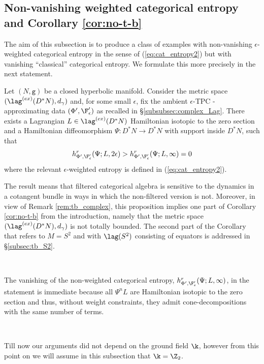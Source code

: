 \subsection{Non-vanishing weighted categorical entropy and Corollary \ref{cor:no-t-b}}
\label{subsec:non-v_Cor} The aim of this subsection is to produce a class of examples with non-vanishing $\epsilon$-weighted categorical entropy in the sense of (\ref{eq:cat_entropy2}) but with vanishing  ``classical'' categorical entropy. We formulate this more precisely in the next statement. 

\begin{prop}\label{cor:hyp_ent} Let $(N,\mathtt{g})$  be a closed hyperbolic manifold. Consider the metric space 
$(\lag^{(ex)}(D^{\ast}N), d_{\gamma})$ and, for some small $\epsilon$, fix the ambient $\epsilon$-TPC - approximating data
$(\Phi',\F'_{\epsilon})$ as recalled in \S\ref{subsubsec:complex_Lag}.
There exists  a Lagrangian $L\in\lag^{(ex)}(D^{\ast}N)$ Hamiltonian isotopic to the zero section and a Hamiltonian diffeomorphism $\Psi: D^{\ast}N\to D^{\ast}N$ with support inside $D^{\ast}N$, such that
$$h^{r}_{\Phi',\F'_{\epsilon}}(\Psi; L, 2\epsilon)>h^{r}_{\Phi',\F'_{\epsilon}}(\Psi;L,\infty)=0$$
where the relevant $\epsilon$-weighted entropy is defined in (\ref{eq:cat_entropy2}).
\end{prop}

The result 
means that filtered categorical algebra is sensitive to the dynamics in a cotangent bundle in ways in which the non-filtered version is not.  Moreover, in view of Remark \ref{rem:tb_complex}, this proposition implies one part of Corollary \ref{cor:no-t-b} from the introduction, namely that the metric space $(\lag^{(ex)}(D^{\ast}N), d_{\gamma})$ is not totally bounded. The second part of the Corollary that refers to $M=S^{2}$ and with 
$\lag(S^{2})$ consisting of equators is addressed in \S\ref{subsec:tb_S2}.

\

The vanishing of the non-weighted categorical entropy, $h^{r}_{\Phi',\F'_{\epsilon}}(\Psi;L,\infty)$, in the statement is immediate  because  all $\Psi^{n}L$ are Hamiltonian isotopic to the zero section and thus, without weight constraints, they admit cone-decompositions with the same number of terms. 

\

Till now our arguments did not depend on the ground field $\k$, however from this point on we will
assume in this subsection that $\k=\Z_{2}$.

